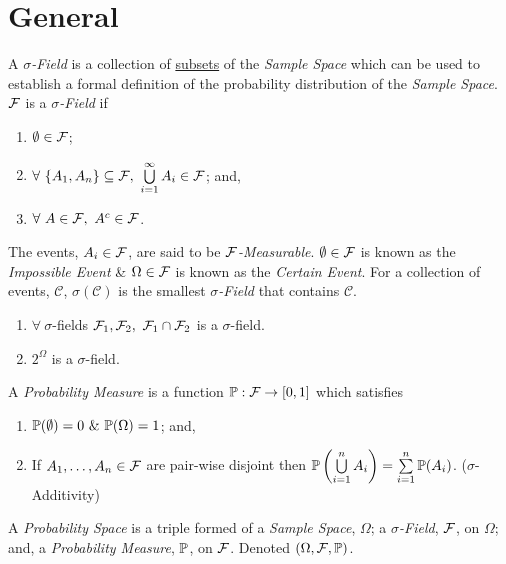 \documentclass[11pt,a4paper]{article}
\begin{document}
\tableofcontents

\newpage

\section{General}

A \textit{$\sigma$-Field } is a collection of \underline{subsets} of the \textit{Sample Space} which can be used to establish a formal definition of the probability distribution of the \textit{Sample Space}. $\mathcal{F}$ is a \textit{$\sigma$-Field} if
\begin{enumerate}
	\item $\emptyset\in\mathcal{F}$;
	\item $\forall\ \{A_1,A_n\}\subseteq\sigmafield,\ \bigcup\limits_{i=1}^\infty A_i\in\sigmafield$; and,
	\item $\forall\ A\in\sigmafield,\ A^c\in\sigmafield$.
\end{enumerate}
The events, $A_i\in\mathcal{F}$, are said to be \textit{$\mathcal{F}$-Measurable}. $\emptyset\in\mathcal{F}$ is known as the \textit{Impossible Event} \& $\Omega\in\mathcal{F}$ is known as the \textit{Certain Event}. For a collection of events, $\mathcal{C}$, $\sigma(\mathcal{C})$ is the smallest \textit{$\sigma$-Field} that contains $\mathcal{C}$.\\

\begin{enumerate}
	\item $\forall\ \sigma$-fields $\sigmafield_1,\sigmafield_2,\ \sigmafield_1\cap\sigmafield_2$ is a $\sigma$-field.
	\item $2^{\Omega}$ is a $\sigma$-field.
\end{enumerate}

A \textit{Probability Measure} is a function $\mathbb{P}:\mathcal{F}\to[0,1]$ which satisfies
\begin{enumerate}
	\item $\prob(\emptyset)=0\ \&\ \prob(\Omega)=1$; and,
	\item If $A_1,\dots,A_n\in\mathcal{F}$ are pair-wise disjoint then $\mathbb{P}\left(\bigcup\limits_{i=1}^nA_i\right)=\sum\limits_{i=1}^n\mathbb{P}(A_i)$. ($\sigma$-Additivity)
\end{enumerate}

A \textit{Probability Space} is a triple formed of a \textit{Sample Space}, $\Omega$; a \textit{$\sigma$-Field}, $\mathcal{F}$, on $\Omega$; and, a \textit{Probability Measure}, $\mathbb{P}$, on $\mathcal{F}$. Denoted $(\Omega,\mathcal{F},\mathbb{P})$.\\
\end{document}
